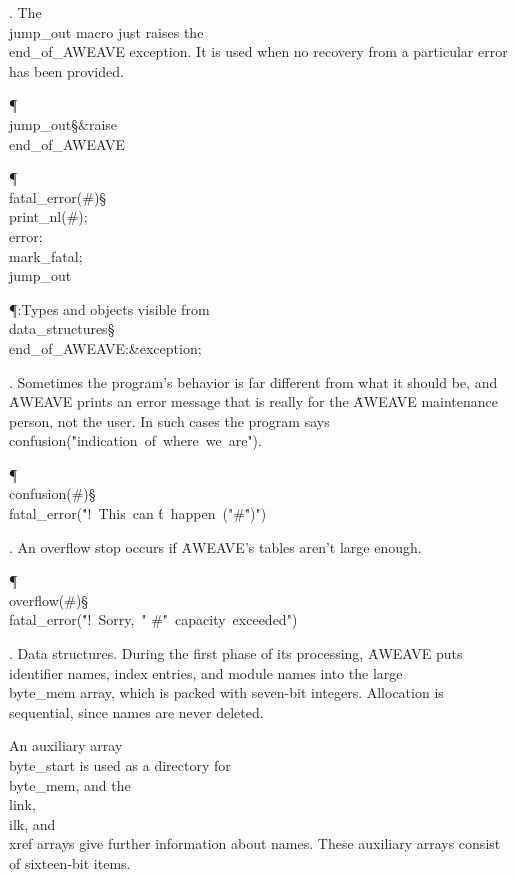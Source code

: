 . The \\{jump\_out} macro just raises the \\{end\_of\_AWEAVE} exception.
It is used when no recovery from a particular error has
been provided.

\Y\P\4\D\\{jump\_out}\?\S\?\&{raise}\8\\{end\_of\_AWEAVE}\par
\P\4\D\\{fatal\_error}\?\1(\?\#\?\2)\S\?\\{print\_nl}\?\1(\?\#\?\2)\?;\5
\\{error};\5
\\{mark\_fatal};\5
\\{jump\_out}\par
\Y\P\?\4:Types and objects visible from \\{data\_structures}\X\mathrel{+}\S%
\?\6
\\{end\_of\_AWEAVE}\?:\&{exception}\?;\par
\fi

. Sometimes the program's behavior is far different from what it should be,
and \.{AWEAVE} prints an error message that is really for the \.{AWEAVE}
maintenance person, not the user. In such cases the program says
\\{confusion}\?(\?\.{"indication\ of\ where\ we\ are"}\?)\?.

\Y\P\4\D\\{confusion}\?\1(\?\#\?\2)\S\?\\{fatal\_error}\?\1(\?\.{"!\ This\ can%
\'t\ happen\ ("}\?\mathbin{\.\&}\?\#\?\mathbin{\.\&}\?\.{")"}\?\2)\?\par
\fi

. An overflow stop occurs if \.{AWEAVE}'s tables aren't large enough.

\Y\P\4\D\\{overflow}\?\1(\?\#\?\2)\S\?\\{fatal\_error}\?\1(\?\.{"!\ Sorry,\ "}%
\?\mathbin{\.\&}\?\#\?\mathbin{\.\&}\?\.{"\ capacity\ exceeded"}\?\2)\?\par
\fi

.  Data structures.
During the first phase of its processing, \.{AWEAVE} puts identifier names,
index entries, and module names into the large \\{byte\_mem} array, which is
packed with seven-bit integers. Allocation is sequential, since names are
never deleted.

An auxiliary array \\{byte\_start} is used as a directory for \\{byte\_mem},
and the \\{link}, \\{ilk}, and \\{xref} arrays give further information about
names.
These auxiliary arrays consist of sixteen-bit items.

